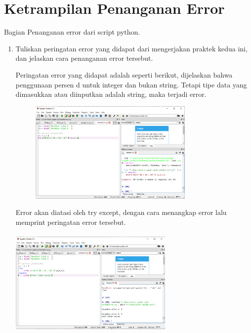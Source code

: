 \section{Ketrampilan Penanganan Error}
Bagian Penanganan error dari script python.
\begin{enumerate}
\item
Tuliskan peringatan error yang didapat dari mengerjakan praktek kedua ini, dan jelaskan cara penanganan error tersebut.
\par Peringatan error yang didapat adalah seperti berikut, dijelaskan bahwa penggunaan persen d untuk integer dan bukan string. Tetapi tipe data yang dimasukkan atau diinputkan adalah string, maka terjadi error.
\begin{figure}[h]
\centerline{\includegraphics[width=8cm]{gambar/contoherror2.PNG}}
\end{figure}

\par Error akan diatasi oleh try except, dengan cara menangkap error lalu memprint peringatan error tersebut.
\paragraph{}
\centerline{\includegraphics[width=8cm]{gambar/contoherror.PNG}}



\end{enumerate}
